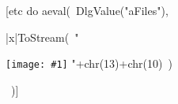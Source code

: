 \documentclass[a4paper,landscape]{article}
\newcommand{\foto}[1]{
\par\texttt{[image: \#1]}
\vfill
}
\begin{document}
\twocolumn
\begin{center}

[etc do aeval(\
  DlgValue("aFiles"),\
  {|x|ToStream(\
    "\foto{"\
    +strtran(trim(DlgValue("JpgDir")),"\","/")\
    +"/"+lower(x[1])+"}"+chr(13)+chr(10)\
  )}\
)]

\end{center}
\end{document}
